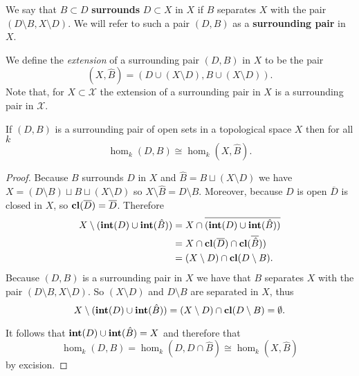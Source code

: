 \begin{definition}[Surrounding]
  We say that $B\subset D$ \textbf{surrounds} $D\subset X$ in $X$ if $B$ separates $X$ with the pair $(D\setminus B, X\setminus D)$.
  We will refer to such a pair $(D, B)$ as a \textbf{surrounding pair} in $X$.
\end{definition}

We define the \emph{extension} of a surrounding pair $(D, B)$ in $X$ to be the pair
\[ (X, \hat{B}) = (D\cup (X\setminus D), B\cup (X\setminus D)).\]
Note that, for $X\subset\mathcal{X}$ the extension of a surrounding pair in $X$ is a surrounding pair in $\mathcal{X}$.

\begin{lemma}\label{lem:extension_iso}
  If $(D, B)$ is a surrounding pair of open sets in a topological space $X$ then for all $k$
  \[ \hom_k(D, B)\cong \hom_k(X, \hat{B}).\]
\end{lemma}
\begin{proof}
  Because $B$ surrounds $D$ in $X$ and $\hat{B} = B\sqcup (X\setminus D)$ we have $X = (D\setminus B)\sqcup B\sqcup (X\setminus D)$ so $X\setminus \hat{B} = D\setminus B$.
  Moreover, because $D$ is open $\overline{D}$ is closed in $X$, so $\mathbf{cl}(\overline{D}) = \overline{D}$.
  Therefore
  \begin{align*}
    X\setminus (\mathbf{int}(D)\cup\mathbf{int}(\hat{B})) &= X\cap \overline{(\mathbf{int}(D)\cup\mathbf{int}(\hat{B}))}\\
      &= X\cap \mathbf{cl}(\overline{D})\cap\mathbf{cl}(\overline{\hat{B}})) \\
      &= (X\setminus D)\cap \mathbf{cl}(D\setminus B).
  \end{align*}
  Because $(D, B)$ is a surrounding pair in $X$ we have that $B$ separates $X$ with the pair $(D\setminus B, X\setminus D)$.
  So $(X\setminus D)$ and $D\setminus B$ are separated in $X$, thus
  \[ X\setminus (\mathbf{int}(D)\cup\mathbf{int}(\hat{B})) = (X\setminus D)\cap \mathbf{cl}(D\setminus B) =\emptyset.\]

  It follows that $\mathbf{int}(D)\cup\mathbf{int}(\hat{B}) = X$ and therefore that
  \[ \hom_k(D, B) = \hom_k(D, D\cap \hat{B}) \cong \hom_k(X, \hat{B})\]
  by excision.
\end{proof}

